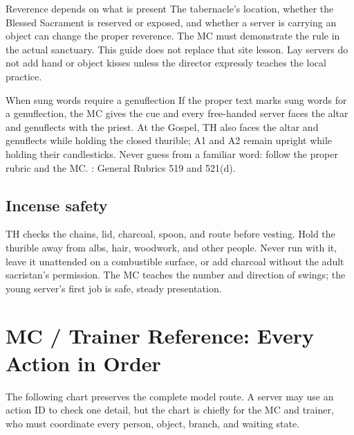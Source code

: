 \begin{watchbox}{Reverence depends on what is present}
The tabernacle's location, whether the Blessed Sacrament is reserved or exposed,
and whether a server is carrying an object can change the proper reverence.
The MC must demonstrate the rule in the actual sanctuary. This guide does not
replace that site lesson. Lay servers do not add hand or object kisses unless
the director expressly teaches the local practice.
\end{watchbox}

\begin{watchbox}{When sung words require a genuflection}
If the proper text marks sung words for a genuflection, the MC gives the cue
and every free-handed server faces the altar and genuflects with the priest.
At the Gospel, TH also faces the altar and genuflects while holding the closed
thurible; A1 and A2 remain upright while holding their candlesticks.
Never guess from a familiar word: follow the proper rubric and the MC.
\MissalRule: General Rubrics 519 and 521(d).
\end{watchbox}

\subsection{Incense safety}

TH checks the chains, lid, charcoal, spoon, and route before vesting. Hold the
thurible away from albs, hair, woodwork, and other people. Never run with it,
leave it unattended on a combustible surface, or add charcoal without the
adult sacristan's permission. The MC teaches the number and direction of swings;
the young server's first job is safe, steady presentation.

\section{MC / Trainer Reference: Every Action in Order}

The following chart preserves the complete model route. A server may use an
action ID to check one detail, but the chart is chiefly for the MC and trainer,
who must coordinate every person, object, branch, and waiting state.

